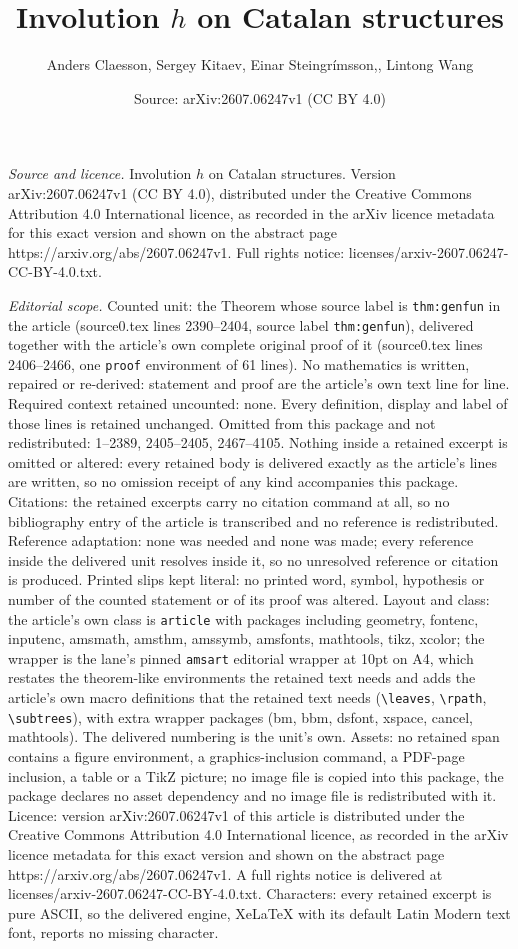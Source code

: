 \documentclass[10pt,a4paper]{amsart}
\title[Involution $h$ on Catalan structures]{Involution $h$ on Catalan structures}
\author{Anders Claesson, Sergey Kitaev, Einar Steingr\'imsson,, Lintong Wang}
\date{Source: arXiv:2607.06247v1 (CC BY 4.0)}
\begin{document}
\maketitle

\noindent\emph{Source and licence.} Involution $h$ on Catalan structures. Version arXiv:2607.06247v1 (CC BY 4.0), distributed under the Creative Commons Attribution 4.0 International licence, as recorded in the arXiv licence metadata for this exact version and shown on the abstract page https://arxiv.org/abs/2607.06247v1. Full rights notice: licenses/arxiv-2607.06247-CC-BY-4.0.txt.\par\smallskip

\noindent\textit{Editorial scope.} Counted unit: the Theorem whose source label is \texttt{thm:genfun} in the article (source0.tex lines 2390--2404, source label \texttt{thm:genfun}), delivered together with the article's own complete original proof of it (source0.tex lines 2406--2466, one \texttt{proof} environment of 61 lines). No mathematics is written, repaired or re-derived: statement and proof are the article's own text line for line. Required context retained uncounted: none. Every definition, display and label of those lines is retained unchanged. Omitted from this package and not redistributed: 1--2389, 2405--2405, 2467--4105. Nothing inside a retained excerpt is omitted or altered: every retained body is delivered exactly as the article's lines are written, so no omission receipt of any kind accompanies this package. Citations: the retained excerpts carry no citation command at all, so no bibliography entry of the article is transcribed and no reference is redistributed. Reference adaptation: none was needed and none was made; every reference inside the delivered unit resolves inside it, so no unresolved reference or citation is produced. Printed slips kept literal: no printed word, symbol, hypothesis or number of the counted statement or of its proof was altered. Layout and class: the article's own class is \texttt{article} with packages including geometry, fontenc, inputenc, amsmath, amsthm, amssymb, amsfonts, mathtools, tikz, xcolor; the wrapper is the lane's pinned \texttt{amsart} editorial wrapper at 10pt on A4, which restates the theorem-like environments the retained text needs and adds the article's own macro definitions that the retained text needs (\texttt{\textbackslash leaves}, \texttt{\textbackslash rpath}, \texttt{\textbackslash subtrees}), with extra wrapper packages (bm, bbm, dsfont, xspace, cancel, mathtools). The delivered numbering is the unit's own. Assets: no retained span contains a figure environment, a graphics-inclusion command, a PDF-page inclusion, a table or a TikZ picture; no image file is copied into this package, the package declares no asset dependency and no image file is redistributed with it. Licence: version arXiv:2607.06247v1 of this article is distributed under the Creative Commons Attribution 4.0 International licence, as recorded in the arXiv licence metadata for this exact version and shown on the abstract page https://arxiv.org/abs/2607.06247v1. A full rights notice is delivered at licenses/arxiv-2607.06247-CC-BY-4.0.txt. Characters: every retained excerpt is pure ASCII, so the delivered engine, XeLaTeX with its default Latin Modern text font, reports no missing character.
\end{document}
